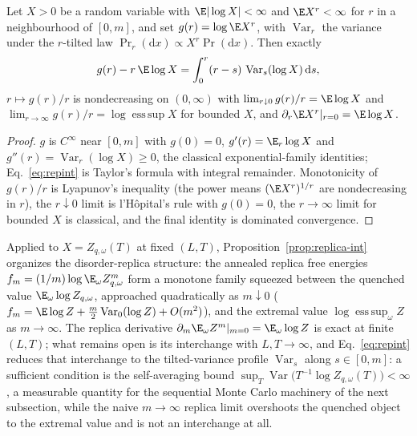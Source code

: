 \begin{proposition}
\label{prop:replica-int}
Let $X>0$ be a random variable with $\E|\log X|<\infty$ and $\E X^r<\infty$
for $r$ in a neighbourhood of $[0,m]$, and set $g(r)=\log\E X^r$, with
$\operatorname{Var}_r$ the variance under the $r$-tilted law $\Pr_r(\mathrm dx)\propto
X^r\Pr(\mathrm dx)$.  Then exactly
\begin{equation}
 g(r)-r\,\E\log X=\int_0^r (r-s)\,\operatorname{Var}_s(\log X)\,\mathrm ds,
 \label{eq:repint}
\end{equation}
$r\mapsto g(r)/r$ is nondecreasing on $(0,\infty)$ with
$\lim_{r\downarrow0}g(r)/r=\E\log X$ and
$\lim_{r\to\infty}g(r)/r=\log\operatorname*{ess\,sup}X$ for bounded $X$,
and $\partial_r\E X^r|_{r=0}=\E\log X$.
\end{proposition}

\begin{proof}
$g$ is $C^\infty$ near $[0,m]$ with $g(0)=0$, $g'(r)=\E_r\log X$ and
$g''(r)=\operatorname{Var}_r(\log X)\ge0$, the classical exponential-family identities;
Eq.~\eqref{eq:repint} is Taylor's formula with integral remainder.
Monotonicity of $g(r)/r$ is Lyapunov's inequality (the power means
$(\E X^r)^{1/r}$ are nondecreasing in $r$), the $r\downarrow0$ limit is
l'H\^opital's rule with $g(0)=0$, the $r\to\infty$ limit for bounded $X$
is classical, and the final identity is dominated convergence.
\end{proof}

Applied to $X=Z_{q,\omega}(T)$ at fixed $(L,T)$,
Proposition~\ref{prop:replica-int} organizes the disorder-replica
structure: the annealed replica free energies
$f_m=(1/m)\log\E_\omega Z_{q,\omega}^m$ form a monotone family squeezed
between the quenched value $\E_\omega\log Z_{q,\omega}$, approached
quadratically as $m\downarrow0$ ($f_m=\E\log Z+\tfrac m2\operatorname{Var}_0(\log Z)
+O(m^2)$), and the extremal value $\log\operatorname*{ess\,sup}_\omega Z$
as $m\to\infty$.  The replica derivative
$\partial_m\E_\omega Z^m|_{m=0}=\E_\omega\log Z$ is exact at finite
$(L,T)$; what remains open is its interchange with $L,T\to\infty$, and
Eq.~\eqref{eq:repint} reduces that interchange to the tilted-variance
profile $\operatorname{Var}_s$ along $s\in[0,m]$: a sufficient condition is the
self-averaging bound $\sup_{T}\operatorname{Var}\!\big(T^{-1}\log Z_{q,\omega}(T)\big)
<\infty$, a measurable quantity for the sequential Monte Carlo machinery
of the next subsection, while the naive $m\to\infty$ replica limit
overshoots the quenched object to the extremal value and is not an
interchange at all.

